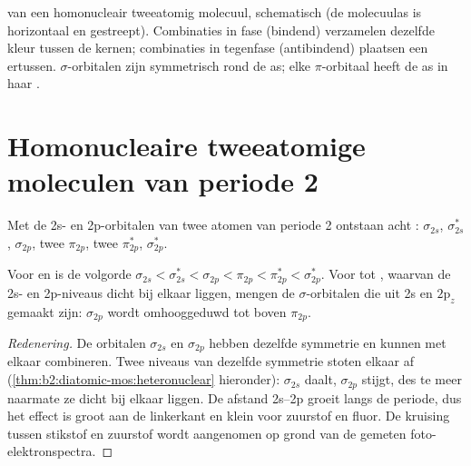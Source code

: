 \begin{omfigure}

{\small {} van een homonucleair tweeatomig molecuul, schematisch (de molecuulas
is horizontaal en gestreept). Combinaties in fase (bindend) verzamelen dezelfde
kleur tussen de kernen; combinaties in tegenfase (antibindend) plaatsen een
 ertussen. $\sigma$-orbitalen zijn symmetrisch rond de as; elke $\pi$-orbitaal
heeft de as in haar .}
\end{omfigure}

\section{Homonucleaire tweeatomige moleculen van periode 2}

Met de 2s- en 2p-orbitalen van twee atomen van periode 2 ontstaan acht :
$\sigma_{2s}$, $\sigma^*_{2s}$, $\sigma_{2p}$, twee $\pi_{2p}$, twee $\pi^*_{2p}$,
$\sigma^*_{2p}$.

\begin{proposition}[s-p-menging]\label{prop:b2:diatomic-mos:sp-mixing}
Voor  en  is de volgorde $\sigma_{2s} < \sigma^*_{2s} < \sigma_{2p} < \pi_{2p} <
\pi^*_{2p} < \sigma^*_{2p}$. Voor  tot , waarvan de 2s- en 2p-niveaus dicht bij elkaar liggen,
mengen de $\sigma$-orbitalen die uit 2s en $2\mathrm p_z$ gemaakt zijn: $\sigma_{2p}$ wordt omhooggeduwd tot boven
$\pi_{2p}$.
\end{proposition}

\begin{proof}[Redenering]
De orbitalen $\sigma_{2s}$ en $\sigma_{2p}$ hebben dezelfde symmetrie en kunnen met
elkaar combineren. Twee niveaus van dezelfde symmetrie stoten elkaar af (\cref{thm:b2:diatomic-mos:heteronuclear}
hieronder): $\sigma_{2s}$ daalt, $\sigma_{2p}$ stijgt, des te meer naarmate ze dicht bij elkaar liggen. De
afstand 2s--2p groeit langs de periode, dus het effect is groot aan de linkerkant en klein voor
zuurstof en fluor. De kruising tussen stikstof en zuurstof wordt aangenomen op grond van de
gemeten foto-elektronspectra.
\end{proof}

